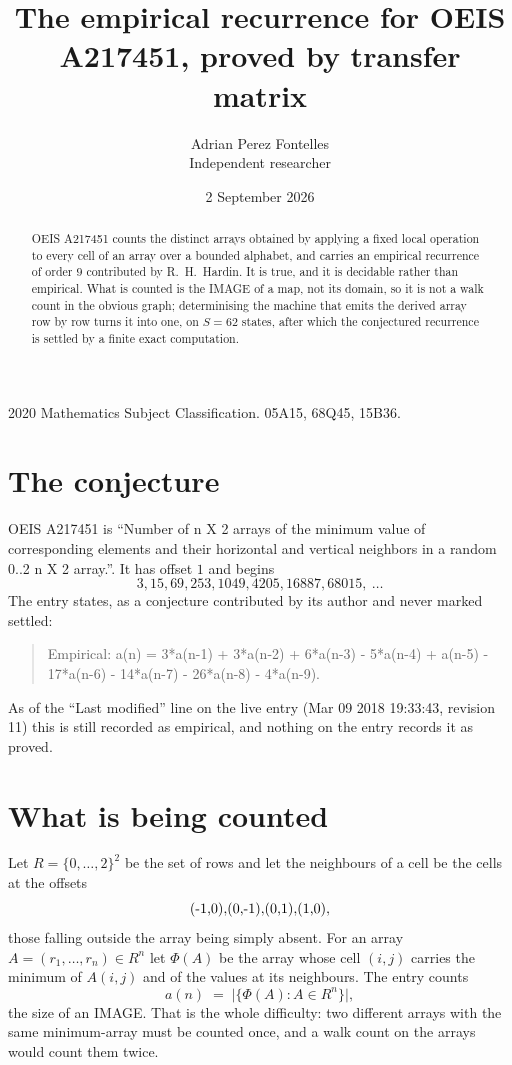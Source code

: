 \documentclass[11pt,a4paper]{article}
\title{The empirical recurrence for OEIS A217451, proved by transfer matrix}
\author{Adrian Perez Fontelles\\ \small Independent researcher}
\date{2 September 2026}
\theoremstyle{plain}
\theoremstyle{definition}
\begin{document}
\maketitle

\begin{abstract}
OEIS A217451 counts the distinct arrays obtained by applying a fixed local operation to every cell
of an array over a bounded alphabet, and carries an empirical recurrence of order $9$
contributed by R.~H.~Hardin. It is true, and it is decidable rather than empirical. What is
counted is the IMAGE of a map, not its domain, so it is not a walk count in the obvious graph;
determinising the machine that emits the derived array row by row turns it into one, on
$S=62$ states, after which the conjectured recurrence is settled by a finite exact
computation.
\end{abstract}

\noindent\small 2020 Mathematics Subject Classification. 05A15, 68Q45, 15B36.\normalsize

\section{The conjecture}

OEIS A217451 is ``Number of n X 2 arrays of the minimum value of corresponding elements and their horizontal and vertical neighbors in a random 0..2 n X 2 array.''. It has offset $1$ and begins
\[
3, 15, 69, 253, 1049, 4205, 16887, 68015,\ \dots
\]
The entry states, as a conjecture contributed by its author and never marked settled:
\begin{quote}
Empirical: a(n) = 3*a(n-1) + 3*a(n-2) + 6*a(n-3) - 5*a(n-4) + a(n-5) - 17*a(n-6) - 14*a(n-7) - 26*a(n-8) - 4*a(n-9).
\end{quote}
As of the ``Last modified'' line on the live entry (Mar 09 2018 19:33:43, revision 11) this is still
recorded as empirical, and nothing on the entry records it as proved.

\section{What is being counted}

Let $R=\{0,\dots,2\}^{2}$ be the set of rows and let the neighbours of
a cell be the cells at the offsets
\[
$(-1,0)$, $(0,-1)$, $(0,1)$, $(1,0)$,
\]
those falling outside the array being simply absent. For an array
$A=(r_1,\dots,r_n)\in R^n$ let $\Phi(A)$ be the array whose cell $(i,j)$ carries the
minimum of $A(i,j)$ and of the values at its neighbours. The entry counts
\[
a(n)\;=\;\bigl|\{\Phi(A):A\in R^n\}\bigr| ,
\]
the size of an IMAGE. That is the whole difficulty: two different arrays with the same
minimum-array must be counted once, and a walk count on the arrays would count them twice.
\end{document}
